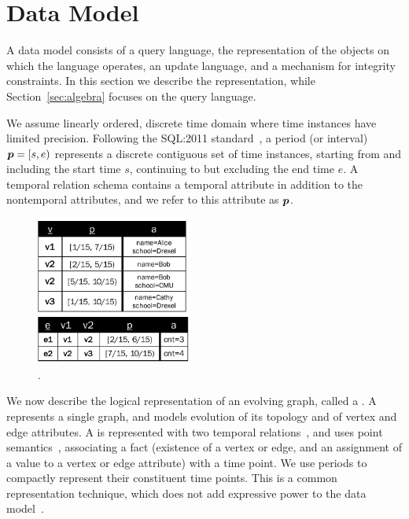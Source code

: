 \section{Data Model}
\label{sec:model}

A data model consists of a query language, the representation of the
objects on which the language operates, an update language, and a
mechanism for integrity constraints.  In this section we describe the
representation, while Section~\ref{sec:algebra} focuses on the query
language.

We assume linearly ordered, discrete time domain where time instances
have limited precision.  Following the SQL:2011
standard~\cite{DBLP:journals/sigmod/KulkarniM12}, a period (or
interval) $\boldsymbol{p} = [s, e)$ represents a discrete contiguous set of time
  instances, starting from and including the start time $s$,
  continuing to but excluding the end time $e$.  A temporal relation
  schema contains a temporal attribute in addition to the nontemporal
  attributes, and we refer to this attribute as $\boldsymbol{p}$.

\begin{figure}[t!]
\centering
\includegraphics[width=2in]{figs/T1_rel.pdf}
\caption{\tg {}.}
\vspace{-0.5cm}
\label{fig:tg_ve}
\end{figure}

We now describe the logical representation of an evolving graph,
called a \tg.  A \tg represents a single graph, and models evolution
of its topology and of vertex and edge attributes.  A \tg is
represented with two temporal
relations~\cite{DBLP:conf/vldb/BohlenSS96}, and uses point
semantics~\cite{DBLP:reference/db/Toman09}, associating a fact
(existence of a vertex or edge, and an assignment of a value to a
vertex or edge attribute) with a time point.  We use periods to
compactly represent their constituent time points.  This is a common
representation technique, which does not add expressive power to the
data model~\cite{DBLP:conf/ictl/Chomicki94}.

